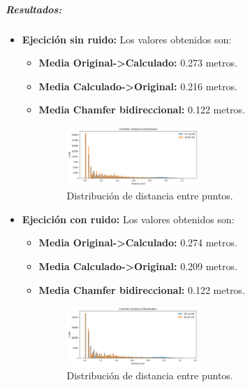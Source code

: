 \documentclass[12pt, a4paper, twoside]{article}
\begin{document}
\subparagraph{Resultados:}
\begin{itemize}
  \item \textbf{Ejecición sin ruido:} Los valores obtenidos son:
  \begin{itemize}
    \item \textbf{Media Original->Calculado:} 0.273 metros.
    \item \textbf{Media Calculado->Original:} 0.216 metros.
    \item \textbf{Media Chamfer\cite{Fan2020Chamfer} bidireccional:} 0.122 metros.
    \begin{figure}[h]
      \centering
        \includegraphics[width=0.5\textwidth]{chamfer_clean.png}
        \caption{Distribución de distancia entre puntos.}
    \end{figure} 
    \end{itemize}
  \newpage
  \item \textbf{Ejecición con ruido:} Los valores obtenidos son:
  \begin{itemize}
    \item \textbf{Media Original->Calculado:} 0.274 metros.
    \item \textbf{Media Calculado->Original:} 0.209 metros.
    \item \textbf{Media Chamfer\cite{Fan2020Chamfer} bidireccional:} 0.122 metros.
    \begin{figure}[h]
      \centering
        \includegraphics[width=0.5\textwidth]{chamfer_noisy.png}
      \caption{Distribución de distancia entre puntos.}
    \end{figure} 
  \end{itemize}
\end{itemize}
\end{document}
